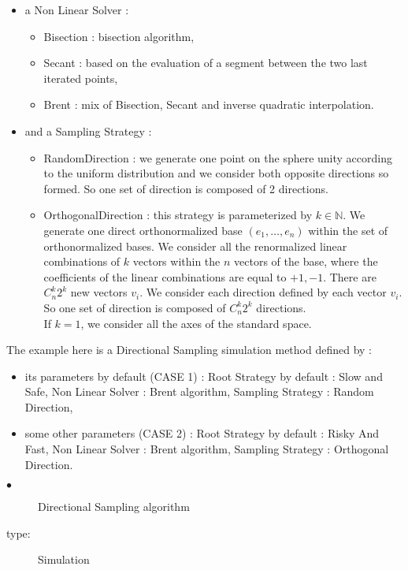 \begin{itemize}
\item a Non Linear Solver :
  \begin{itemize}
  \item Bisection : bisection algorithm,
  \item Secant : based on the evaluation of a segment between the two last iterated points,
  \item Brent : mix of Bisection, Secant and inverse quadratic interpolation.
  \end{itemize}

\item and a Sampling Strategy :
  \begin{itemize}
  \item RandomDirection : we generate one point on the sphere unity according to the uniform distribution and we consider both opposite directions so formed. So one set of direction is composed of 2 directions.
  \item OrthogonalDirection : this strategy is parameterized by $k\in \mathbb{N}$. We generate one direct orthonormalized base $(e_1, \dots, e_n)$ within the set of orthonormalized bases. We consider all the renormalized linear combinations of $k$ vectors within the $n$ vectors of the base, where the coefficients of the linear combinations are equal to ${+1, -1}$. There are $C_n^k 2^k$ new vectors $v_i$. We consider each direction defined by each vector $v_i$. So one set of direction is composed of $C_n^k 2^k$ directions.\\
    If $k=1$, we consider all the axes of the standard space.
  \end{itemize}
\end{itemize}


The example here is a Directional Sampling simulation method defined by :
\begin{itemize}
\item its parameters by default (CASE 1) :  Root Strategy by default : Slow and Safe, Non Linear Solver : Brent algorithm, Sampling Strategy : Random Direction,
\item some other parameters (CASE 2) :  Root Strategy by default : Risky And Fast, Non Linear Solver : Brent algorithm, Sampling Strategy : Orthogonal Direction.
\end{itemize}
\vspace*{0.2cm}

{
  \begin{description}
  \item[$\bullet$] Directional Sampling algorithm
  \item[type:] Simulation
  \end{description}
}

